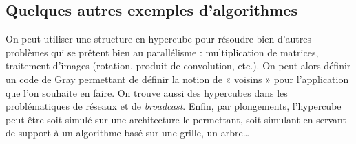 \subsection{Quelques autres exemples d'algorithmes}
On peut utiliser une structure en hypercube pour résoudre bien d'autres problèmes qui se prêtent bien au parallélisme : multiplication de matrices, traitement d'images (rotation, produit de convolution, etc.). On peut alors définir un code de Gray permettant de définir la notion de « voisins » pour l'application que l'on souhaite en faire. On trouve aussi des hypercubes dans les problématiques de réseaux et de \textit{broadcast}. Enfin, par plongements, l'hypercube peut être soit simulé sur une architecture le permettant, soit simulant en servant de support à un algorithme basé sur une grille, un arbre…